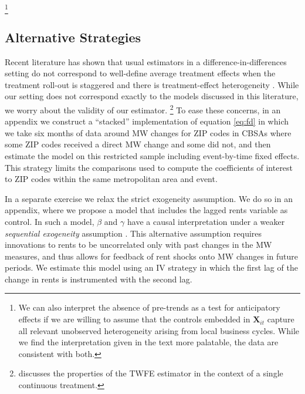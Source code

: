 \footnote{We can also interpret the absence of pre-trends as a test for 
anticipatory effects if we are willing to assume that the controls embedded in 
$\mathbf{X}_{it}$ capture all relevant unobserved heterogeneity arising from 
local business cycles.
While we find the interpretation given in the text more palatable, the data are 
consistent with both.}


\subsection{Alternative Strategies}\label{sec:alt_emp_strategies}

Recent literature has shown that usual estimators in a difference-in-differences 
setting do not correspond to well-define average treatment effects when the 
treatment roll-out is staggered and there is treatment-effect heterogeneity 
\parencite{deChaisemartinEtAl2022,RothEtAl2022}.
While our setting does not correspond exactly to the models discussed in this
literature, we worry about the validity of our estimator.%
\footnote{\textcite[][Section 3.4]{CallawayEtAl2021} discusses the properties 
of the TWFE estimator in the context of a single continuous treatment.}
To ease these concerns, in an appendix we construct a ``stacked'' implementation 
of equation \eqref{eq:fd} in which we take six months of data around MW changes 
for ZIP codes in CBSAs where some ZIP codes received a direct MW change and 
some did not, 
and then estimate the model on this restricted sample including event-by-time 
fixed effects.
This strategy limits the comparisons used to compute the coefficients of 
interest to ZIP codes within the same metropolitan area and event.

In a separate exercise we relax the strict exogeneity assumption.
We do so in an appendix, where we propose a model that includes the lagged 
rents variable as control.
In such a model, $\beta$ and $\gamma$ have a causal interpretation under a 
weaker \textit{sequential exogeneity} assumption
\parencite{ArellanoBond1991, ArellanoHonore2001}.
This alternative assumption requires innovations to rents to be uncorrelated 
only with past changes in the MW measures, and thus allows for feedback of 
rent shocks onto MW changes in future periods.
We estimate this model using an IV strategy in which the first lag of the change
in rents is instrumented with the second lag.


